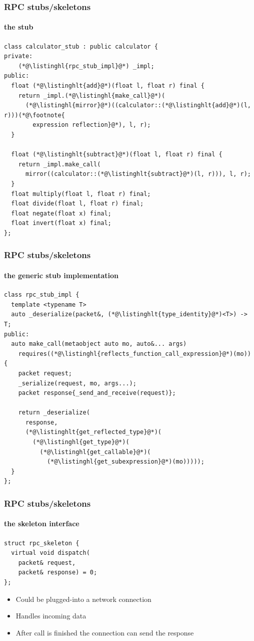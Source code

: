 \documentclass[aspectratio=169,compress,table,xcolor=table]{beamer}
\begin{document}
\begin{frame}[fragile]
  \frametitle{RPC stubs/skeletons}
  \framesubtitle{the stub}
  \begin{lstlisting}[language=c++2x,basicstyle=\footnotesize\ttfamily]
class calculator_stub : public calculator {
private:
    (*@\listinghl{rpc_stub_impl}@*) _impl;
public:
  float (*@\listinghlt{add}@*)(float l, float r) final {
    return _impl.(*@\listinghl{make_call}@*)(
      (*@\listinghl{mirror}@*)((calculator::(*@\listinghlt{add}@*)(l, r)))(*@\footnote{
        expression reflection}@*), l, r);
  }

  float (*@\listinghlt{subtract}@*)(float l, float r) final {
    return _impl.make_call(
      mirror((calculator::(*@\listinghlt{subtract}@*)(l, r))), l, r);
  }
  float multiply(float l, float r) final;
  float divide(float l, float r) final;
  float negate(float x) final;
  float invert(float x) final;
};
  \end{lstlisting}
\end{frame}
\begin{frame}[fragile]
  \frametitle{RPC stubs/skeletons}
  \framesubtitle{the generic stub implementation}
  \begin{lstlisting}[language=c++2x,basicstyle=\footnotesize\ttfamily]
class rpc_stub_impl {
  template <typename T>
  auto _deserialize(packet&, (*@\listinghlt{type_identity}@*)<T>) -> T;
public:
  auto make_call(metaobject auto mo, auto&... args)
    requires((*@\listinghl{reflects_function_call_expression}@*)(mo)) {
    packet request;
    _serialize(request, mo, args...);
    packet response{_send_and_receive(request)};

    return _deserialize(
      response,
      (*@\listinghlt{get_reflected_type}@*)(
        (*@\listinghl{get_type}@*)(
          (*@\listinghl{get_callable}@*)(
            (*@\listinghl{get_subexpression}@*)(mo)))));
  }
};
  \end{lstlisting}
\end{frame}
\begin{frame}[fragile]
  \frametitle{RPC stubs/skeletons}
  \framesubtitle{the skeleton interface}
  \begin{lstlisting}[language=c++2x]
struct rpc_skeleton {
  virtual void dispatch(
    packet& request,
    packet& response) = 0;
};
  \end{lstlisting}
  \begin{itemize}
    \item Could be plugged-into a network connection
    \item Handles incoming data
    \item After call is finished the connection can send the response
  \end{itemize}
\end{frame}
\end{document}
